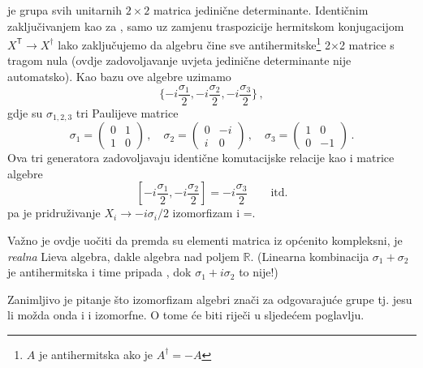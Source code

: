 \begin{primjer}
     je grupa svih unitarnih $2\times 2$ matrica jedinične determinante.
    Identičnim zaključivanjem kao za , samo uz zamjenu traspozicije
    hermitskom konjugacijom $X^\mathsf{T} \to X^\mathsf{\dagger}$ lako
    zaključujemo da algebru  čine sve
    antihermitske\footnote{$A$ je antihermitska ako je $A^\dagger=-A$} 
    2$\times$2 matrice s tragom nula (ovdje zadovoljavanje uvjeta jedinične
    determinante nije automatsko). Kao bazu ove algebre uzimamo
\begin{equation}
     \{ -i\frac{\sigma_1}{2},  -i\frac{\sigma_2}{2},  -i\frac{\sigma_3}{2} \} \,,
\end{equation}
gdje su $\sigma_{1,2,3}$ tri Paulijeve matrice
\begin{equation}
\sigma_1=\left( \begin{array}{cc} 0 &  1 \\ 1 & 0 \end{array} \right) \,,
\quad
\sigma_2=\left( \begin{array}{cc} 0 & -i \\ i & 0 \end{array} \right) \,,
\quad
\sigma_3=\left( \begin{array}{cc} 1 &  0 \\ 0 &-1 \end{array} \right) \,.
\label{eq:PaulijeveMatrice}
\end{equation}
Ova tri generatora zadovoljavaju identične komutacijske relacije kao i matrice
 algebre
\begin{displaymath}
 \left[ -i\frac{\sigma_1}{2}, -i\frac{\sigma_2}{2} \right] =
 -i\frac{\sigma_3}{2} \qquad \text{itd.}
\end{displaymath}
pa je pridruživanje $X_i \to -i \sigma_i/2$  izomorfizam i
=.

Važno je ovdje uočiti da premda su elementi matrica iz  općenito kompleksni,
 je \emph{realna} Lieva algebra, dakle algebra nad poljem $\mathbb{R}$. 
(Linearna kombinacija $\sigma_1 + \sigma_2$ je antihermitska i time pripada ,
dok $\sigma_1 + i \sigma_2$ to nije!)

Zanimljivo je pitanje što izomorfizam algebri znači za odgovarajuće grupe tj.
jesu li možda onda i  i  izomorfne. O tome će biti riječi u sljedećem poglavlju.
\end{primjer}

